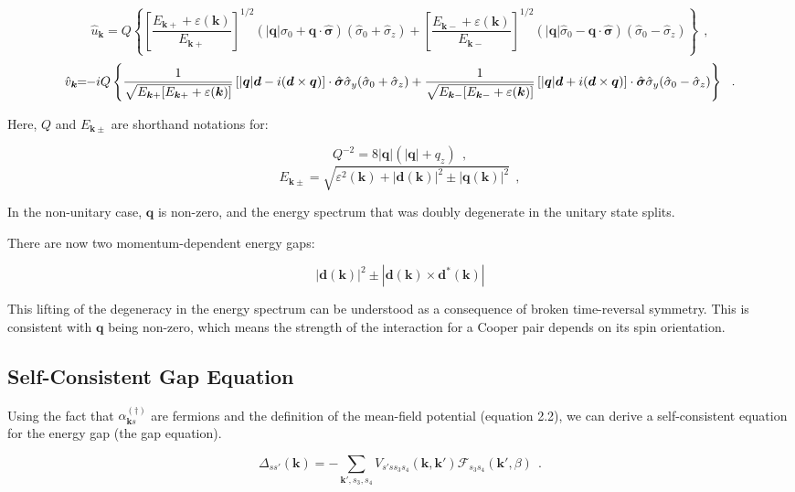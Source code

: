 \documentclass[uplatex,a4j,12pt,dvipdfmx]{jsarticle}
\begin{document}
\[
	\hat{u}_{\bm{k}}
	\!\!
	=
	\!\!
	Q
	\left\{
	\left[
		\dfrac{ E_{\bm{k} + } + \varepsilon(\bm{k}) }
		{ E_{\bm{k} + } }
		\right]^{1/2}
	(
	| \bm{q} | \hat{\sigma}_{0} + \bm{q} \cdot \hat{\bm{\sigma}}
	)
	(
	\hat{\sigma}_{0} + \hat{\sigma}_{z}
	)
	+
	\left[
		\dfrac{ E_{\bm{k} - } + \varepsilon(\bm{k}) }
		{ E_{\bm{k} - } }
		\right]^{1/2}
	(
	| \bm{q} | \hat{\sigma}_{0} - \bm{q} \cdot \hat{\bm{\sigma}}
	)
	(
	\hat{\sigma}_{0} - \hat{\sigma}_{z}
	)
	\right\}
	\ \ ,
	\nonumber
\]\[
	\hat{v}_{\bm{k}}
	\!\!
	=
	\!\!
	- i Q
	\left\{
	\dfrac{1}{\sqrt{ E_{\bm{k} +} [ E_{\bm{k} +} + \varepsilon(\bm{k}) ] }}
	\left[
		| \bm{q} | \bm{d} - i ( \bm{d} \times \bm{q} )
		\right]
	\cdot
	\hat{\bm{\sigma}}
	\hat{\sigma}_{y}
	(
	\hat{\sigma}_{0} + \hat{\sigma}_{z}
	)
	+
	\dfrac{1}{\sqrt{ E_{\bm{k} -} [ E_{\bm{k} -} + \varepsilon(\bm{k}) ] }}
	\left[
		| \bm{q} | \bm{d} + i ( \bm{d} \times \bm{q} )
		\right]
	\cdot
	\hat{\bm{\sigma}}
	\hat{\sigma}_{y}
	(
	\hat{\sigma}_{0} - \hat{\sigma}_{z}
	)
	\right\}
	\ \ .
	\\
\]

Here, $Q$ and $E_{\bm{k} \pm}$ are shorthand notations for:

\[
	Q^{-2}
	=
	8 | \bm{q} | ( | \bm{q} | + q_{z} )
	\ \ ,
\]\[
	E_{\bm{k} \pm}
	=
	\sqrt{ \varepsilon^{2}(\bm{k}) + | \bm{d}(\bm{k}) |^{2} \pm | \bm{q}(\bm{k}) |^{2} }
	\ \ ,
	\nonumber
\]

In the non-unitary case, $\bm{q}$ is non-zero, and the energy spectrum that was doubly degenerate in the unitary state splits.

There are now two momentum-dependent energy gaps:

\[
	| \bm{d}(\bm{k}) |^{2} \pm | \bm{d}(\bm{k}) \times \bm{d}^{*}(\bm{k}) |
	\nonumber
\]

This lifting of the degeneracy in the energy spectrum can be understood as a consequence of broken time-reversal symmetry.
This is consistent with $\bm{q}$ being non-zero, which means the strength of the interaction for a Cooper pair depends on its spin orientation.
\subsection{Self-Consistent Gap Equation}

Using the fact that $\alpha_{\bm{k}s}^{(\dagger)}$ are fermions and the definition of the mean-field potential (equation 2.2), we can derive a self-consistent equation for the energy gap (the gap equation).

\[
	\Delta_{ss'}(\bm{k})
	=
	- \sum_{\bm{k}',s_{3},s_{4}}
	V_{s' s s_{3} s_{4}}
	(\bm{k},\bm{k}')
	\mathcal{F}_{s_{3} s_{4}}(\bm{k}',\beta)
	\ \ .
\]
\end{document}
